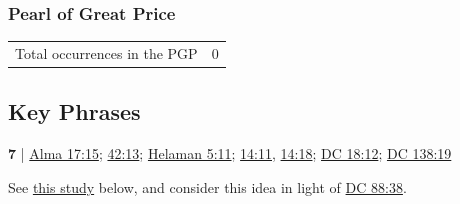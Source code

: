 	\subsubsection{Pearl of Great Price} %
		\label{CONDITION-PGP}
	
		\begin{tabular}{ll}
			Total occurrences in the PGP & 0
		\end{tabular}
		
\subsection{Key Phrases} %
	\label{CONDITION-PHRASES}

	\begin{compactdesc}
		\item[condition(s) of repentance] \textbf{7} | \hyperref[ALMA-17-15]{Alma 17:15}; \hyperref[ALMA-42-13]{42:13}; \hyperref[HELAMAN-5-11]{Helaman 5:11}; \hyperref[HELAMAN-14-11]{14:11}, \hyperref[HELAMAN-14-18]{14:18}; \hyperref[DC18-12]{DC 18:12}; \hyperref[DC138-19]{DC 138:19}
			\begin{compactdesc}
				\item[Commentary] See \hyperref[CONDITION-repentance]{this study} below, and consider this idea in light of \hyperref[DC88-38]{DC 88:38}.
			\end{compactdesc}
	\end{compactdesc}
	


	
	
